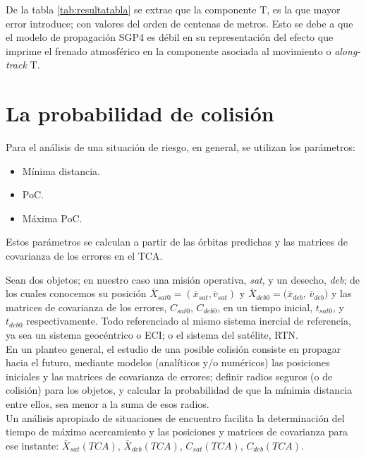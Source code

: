 {De la tabla \ref{tab:resultatabla} se extrae que la componente T, es la que mayor error introduce; con valores del orden de centenas de metros. Esto se debe a que el modelo de propagaci\'on SGP4 es d\'ebil en su representaci\'on del efecto que imprime el frenado atmosf\'erico en la componente asociada al movimiento o {\it{along-track}} T. 

\section{La probabilidad de colisi\'on}
Para el an\'alisis de una situaci\'on de riesgo, en general, se utilizan los par\'ametros:\\


\begin{itemize}
\centering
\itemsep0em
\item M\'inima distancia.
\item PoC.
\item M\'axima PoC.
\end{itemize}


Estos par\'ametros se calculan a partir de las \'orbitas predichas y las matrices de covarianza de los errores en el TCA.

Sean dos objetos; en nuestro caso una misi\'on operativa, {\it{sat}}, y un desecho, {\it{deb}}; de los cuales conocemos su posici\'on $\bar{X}_{sat0}=(\bar{x}_{sat},\bar{v}_{sat})$ y $\bar{X}_{deb0}=(\bar{x}_{deb}$,  $\bar{v}_{deb})$ y las matrices de covarianza de los errores, $C_{sat0}$, $C_{deb0}$, en un tiempo inicial,  $t_{sat0}$, y $t_{deb0}$ respectivamente. Todo referenciado al mismo sistema inercial de referencia, ya sea un sistema geoc\'entrico o \ac{ECI}; o el sistema del sat\'elite, \ac{RTN}.\\

En un planteo general, el estudio de una posible colisi\'on consiste en propagar hacia el futuro, mediante modelos (anal\'iticos y/o num\'ericos) las posiciones iniciales y las matrices de covarianza de errores; definir radios seguros (o de colisi\'on) para los objetos, y calcular la probabilidad de que la m\'inimia distancia entre ellos, sea menor a la suma de esos radios.\\
Un an\'alisis apropiado de situaciones de encuentro facilita la determinaci\'on del tiempo de m\'aximo acercamiento y las posiciones y matrices de covarianza para ese instante:  $\bar{X}_{sat}(TCA)$, $\bar{X}_{deb}(TCA)$, $C_{sat}(TCA)$, $C_{deb}(TCA)$.\\

}
